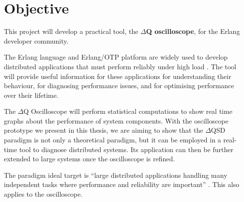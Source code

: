 \section{Objective}
         This project will develop a practical tool, the \textbf{$\Delta$Q oscilloscope}, for the Erlang developer community. 
    
    The Erlang language and Erlang/OTP platform are widely used to develop distributed applications that must perform reliably under high load \cite{erl-art} \cite{erl}. The tool will provide useful information for these applications for understanding their behaviour, for diagnosing performance issues, and for optimising performance over their lifetime. \cite{post}

    The $\Delta$Q Oscilloscope will perform statistical computations to show real time graphs about the performance of system components. With the oscilloscope prototype we present in this thesis, we are aiming to show that the $\Delta$QSD paradigm is not only a theoretical paradigm, but it can be employed in a real-time tool to diagnose distributed systems. Its application can then be further extended to large systems once the oscilloscope is refined.

    The paradigm ideal target is ``large distributed applications handling many independent tasks where performance and reliability are important'' \cite{dq-tut}. This also applies to the oscilloscope.
    

